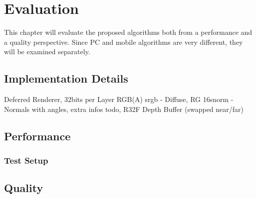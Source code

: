 \documentclass[thesis.tex]{subfiles}
\begin{document}
\chapter{Evaluation}
This chapter will evaluate the proposed algorithms both from a performance and a quality perspective. Since PC and mobile algorithms are very different, they will be examined separately.

\section{Implementation Details}
Deferred Renderer, 32bits per Layer RGB(A) srgb - Diffuse, RG 16snorm - Normals with angles, extra infos todo, R32F Depth Buffer (swapped near/far)

\section{Performance}

\subsection{Test Setup}

\newpage

\section{Quality}

\subfilebib %
\end{document}
